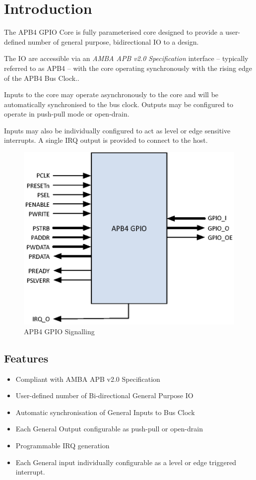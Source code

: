 \chapter{Introduction} \label{introduction}

The APB4 GPIO Core is fully parameterised core designed to provide a
user-defined number of general purpose, bidirectional IO to a design.

The IO are accessible via an \emph{AMBA APB v2.0 Specification}
interface -- typically referred to as APB4 -- with the core operating
synchronously with the rising edge of the APB4 Bus Clock..

Inputs to the core may operate asynchronously to the core and will be
automatically synchronised to the bus clock. Outputs may be configured
to operate in push-pull mode or open-drain.

Inputs may also be individually configured to act as level or edge sensitive interrupts. A single IRQ output is provided to connect to the host.

\begin{figure}[tbh]
	\centering
	\includegraphics{assets/img/apb4-gpio-sig}
	\caption{APB4 GPIO Signalling}
	\label{fig:apb4-gpio-sig}
\end{figure}

\section{Features}\label{features}

\begin{itemize}
\item
  Compliant with AMBA APB v2.0 Specification
\item
  User-defined number of Bi-directional General Purpose IO
\item
  Automatic synchronisation of General Inputs to Bus Clock
\item
  Each General Output configurable as push-pull or open-drain
\item
  Programmable IRQ generation
\item
  Each General input individually configurable as a level or edge triggered interrupt.
\end{itemize}
